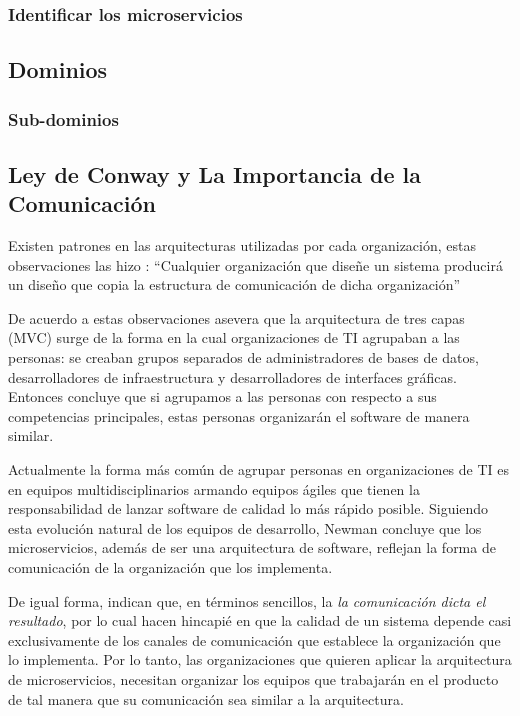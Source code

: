 \subsubsection{Identificar los microservicios}

\subsection{Dominios}

\subsubsection{Sub-dominios}


\subsection{Ley de Conway y La Importancia de la Comunicación}

Existen patrones en las arquitecturas utilizadas por cada organización, estas observaciones
las hizo \cite{conway1968committees}: ``Cualquier organización que diseñe un sistema producirá
un diseño que copia la estructura de comunicación de dicha organización''


De acuerdo a estas observaciones \cite{newman2019monolith} asevera que la arquitectura de tres capas
(MVC) surge de la forma en la cual organizaciones de TI agrupaban a las personas: se creaban grupos
separados de administradores de bases de datos, desarrolladores de infraestructura y desarrolladores
de interfaces gráficas. Entonces concluye que si agrupamos a las personas con respecto a sus competencias
principales, estas personas organizarán el software de manera similar.

Actualmente la forma más común de agrupar personas en organizaciones de TI es en equipos multidisciplinarios
armando equipos ágiles que tienen la responsabilidad de lanzar software de calidad lo más rápido posible.
Siguiendo esta evolución natural de los equipos de desarrollo, Newman concluye que los microservicios,
además de ser una arquitectura de software, reflejan la forma de comunicación de la organización
que los implementa.

De igual forma, \cite{nadareishvili2016microservice} indican que, en términos sencillos, la
{\it la comunicación dicta el resultado}, por lo cual hacen hincapié en que la calidad de un sistema
depende casi exclusivamente de los canales de comunicación que establece la organización que lo implementa.
Por lo tanto, las organizaciones que quieren aplicar la arquitectura de microservicios, necesitan
organizar los equipos que trabajarán en el producto de tal manera que su comunicación sea similar a 
la arquitectura.


